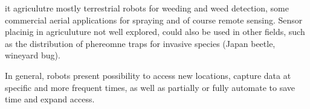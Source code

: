 it agriculutre mostly terrestrial robots for weeding and weed detection, some commercial aerial applications for spraying and of course remote sensing. Sensor placinig in agriculuture not well explored, could also be used in other fields, such as the distribution of phereomne traps for invasive species (Japan beetle, wineyard bug). %

In general, robots present possibility to access new locations, capture data at specific and more frequent times, as well as partially or fully automate to save time and expand access.




